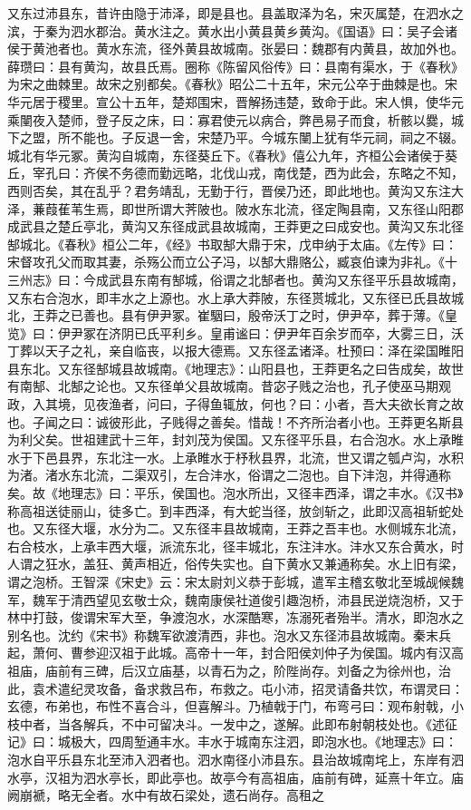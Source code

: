 \documentclass[12pt,UTF8]{ctexbook}
\begin{document}
又东过沛县东，昔许由隐于沛泽，即是县也。县盖取泽为名，宋灭属楚，在泗水之滨，于秦为泗水郡治。黄水注之。黄水出小黄县黄乡黄沟。《国语》曰：吴子会诸侯于黄池者也。黄水东流，径外黄县故城南。张晏曰：魏郡有内黄县，故加外也。薛瓒曰：县有黄沟，故县氏焉。圈称《陈留风俗传》曰：县南有渠水，于《春秋》为宋之曲棘里。故宋之别都矣。《春秋》昭公二十五年，宋元公卒于曲棘是也。宋华元居于稷里。宣公十五年，楚郑围宋，晋解扬违楚，致命于此。宋人惧，使华元乘闉夜入楚师，登子反之床，曰：寡君使元以病合，弊邑易子而食，析骸以爨，城下之盟，所不能也。子反退一舍，宋楚乃平。今城东闉上犹有华元祠，祠之不辍。城北有华元冢。黄沟自城南，东径葵丘下。《春秋》僖公九年，齐桓公会诸侯于葵丘，宰孔曰：齐侯不务德而勤远略，北伐山戎，南伐楚，西为此会，东略之不知，西则否矣，其在乱乎？君务靖乱，无勤于行，晋侯乃还，即此地也。黄沟又东注大泽，蒹葭萑苇生焉，即世所谓大荠陂也。陂水东北流，径定陶县南，又东径山阳郡成武县之楚丘亭北，黄沟又东径成武县故城南，王莽更之曰成安也。黄沟又东北径郜城北。《春秋》桓公二年，《经》书取郜大鼎于宋，戊申纳于太庙。《左传》曰：宋督攻孔父而取其妻，杀殇公而立公子冯，以郜大鼎赂公，臧哀伯谏为非礼。《十三州志》曰：今成武县东南有郜城，俗谓之北郜者也。黄沟又东径平乐县故城南，又东右合泡水，即丰水之上源也。水上承大莽陂，东径贳城北，又东径已氏县故城北，王莽之已善也。县有伊尹冢。崔駰曰，殷帝沃丁之时，伊尹卒，葬于薄。《皇览》曰：伊尹冢在济阴已氏平利乡。皇甫谧曰：伊尹年百余岁而卒，大雾三日，沃丁葬以天子之礼，亲自临丧，以报大德焉。又东径孟诸泽。杜预曰：泽在梁国睢阳县东北。又东径郜城县故城南。《地理志》：山阳县也，王莽更名之曰告成矣，故世有南郜、北郜之论也。又东径单父县故城南。昔宓子贱之治也，孔子使巫马期观政，入其境，见夜渔者，问曰，子得鱼辄放，何也？曰：小者，吾大夫欲长育之故也。子闻之曰：诚彼形此，子贱得之善矣。惜哉！不齐所治者小也。王莽更名斯县为利父矣。世祖建武十三年，封刘茂为侯国。又东径平乐县，右合泡水。水上承睢水于下邑县界，东北注一水。上承睢水于杼秋县界，北流，世又谓之瓠卢沟，水积为渚。渚水东北流，二渠双引，左合沣水，俗谓之二泡也。自下沣泡，并得通称矣。故《地理志》曰：平乐，侯国也。泡水所出，又径丰西泽，谓之丰水。《汉书》称高祖送徒丽山，徒多亡。到丰西泽，有大蛇当径，放剑斩之，此即汉高祖斩蛇处也。又东径大堰，水分为二。又东径丰县故城南，王莽之吾丰也。水侧城东北流，右合枝水，上承丰西大堰，派流东北，径丰城北，东注沣水。沣水又东合黄水，时人谓之狂水，盖狂、黄声相近，俗传失实也。自下黄水又兼通称矣。水上旧有梁，谓之泡桥。王智深《宋史》云：宋太尉刘义恭于彭城，遣军主稽玄敬北至城觇候魏军，魏军于清西望见玄敬士众，魏南康侯社道俊引趣泡桥，沛县民逆烧泡桥，又于林中打鼓，俊谓宋军大至，争渡泡水，水深酷寒，冻溺死者殆半。清水，即泡水之别名也。沈约《宋书》称魏军欲渡清西，非也。泡水又东径沛县故城南。秦末兵起，萧何、曹参迎汉祖于此城。高帝十一年，封合阳侯刘仲子为侯国。城内有汉高祖庙，庙前有三碑，后汉立庙基，以青石为之，阶陛尚存。刘备之为徐州也，治此，袁术遣纪灵攻备，备求救吕布，布救之。屯小沛，招灵请备共饮，布谓灵曰：玄德，布弟也，布性不喜合斗，但喜解斗。乃植戟于门，布弯弓曰：观布射戟，小枝中者，当各解兵，不中可留决斗。一发中之，遂解。此即布射朝枝处也。《述征记》曰：城极大，四周堑通丰水。丰水于城南东注泗，即泡水也。《地理志》曰：泡水自平乐县东北至沛入泗者也。泗水南径小沛县东。县治故城南垞上，东岸有泗水亭，汉祖为泗水亭长，即此亭也。故亭今有高祖庙，庙前有碑，延熹十年立。庙阙崩褫，略无全者。水中有故石梁处，遗石尚存。高租之
\end{document}
